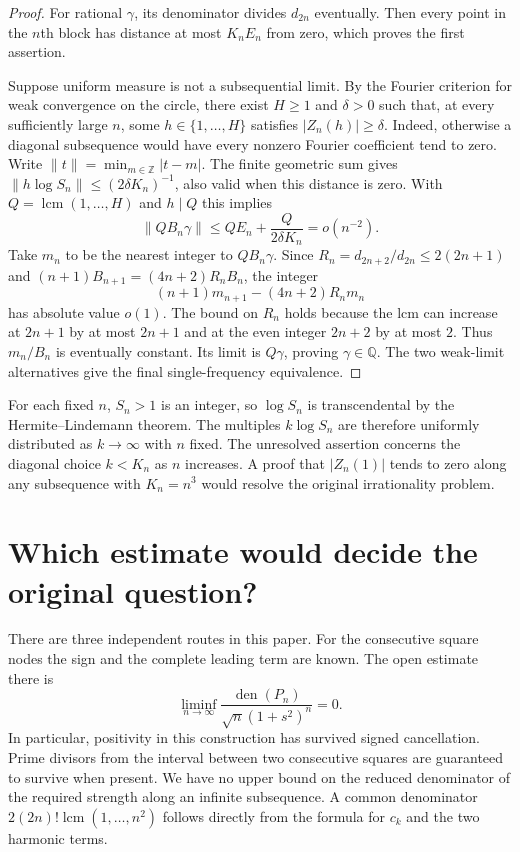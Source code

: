 \documentclass[11pt,a4paper,oneside,openany]{report}
\theoremstyle{remark}\newtheorem{remark}[theorem]{Remark}
\numberwithin{equation}{section}
\begin{document}
\begin{proof}
For rational $\gamma$, its denominator divides $d_{2n}$ eventually.
Then every point in the $n$th block has distance at most $K_n E_n$ from
zero, which proves the first assertion.

Suppose uniform measure is not a subsequential limit. By the Fourier
criterion for weak convergence on the circle, there exist
$H\ge1$ and $\delta>0$ such that, at every sufficiently large $n$,
some $h\in\{1,\ldots,H\}$ satisfies $|Z_n(h)|\ge\delta$.
Indeed, otherwise a diagonal subsequence would have every nonzero
Fourier coefficient tend to zero. Write $\|t\|=\min_{m\in\mathbb Z}|t-m|$.
The finite geometric sum gives $\|h\log S_n\|\le(2\delta K_n)^{-1}$,
also valid when this distance is zero. With $Q=\operatorname{lcm}(1,\ldots,H)$
and $h\mid Q$ this implies
\[
 \|Q B_n\gamma\|
 \le Q E_n+\frac{Q}{2\delta K_n}=o(n^{-2}).
\]
Take $m_n$ to be the nearest integer to $Q B_n\gamma$. Since
$R_n=d_{2n+2}/d_{2n}\le2(2n+1)$ and
$(n+1)B_{n+1}=(4n+2)R_nB_n$, the integer
\[
 (n+1)m_{n+1}-(4n+2)R_nm_n
\]
has absolute value $o(1)$. The bound on $R_n$ holds because the
lcm can increase at $2n+1$ by at most $2n+1$ and at the even
integer $2n+2$ by at most $2$. Thus $m_n/B_n$ is eventually constant.
Its limit is $Q\gamma$, proving $\gamma\in\mathbb Q$. The two
weak-limit alternatives give the final single-frequency equivalence.
\end{proof}

For each fixed $n$, $S_n>1$ is an integer, so $\log S_n$ is
transcendental by the Hermite--Lindemann theorem. The multiples
$k\log S_n$ are therefore uniformly distributed as $k\to\infty$
with $n$ fixed. The unresolved assertion concerns the diagonal
choice $k<K_n$ as $n$ increases. A proof that $|Z_n(1)|$ tends to
zero along any subsequence with $K_n=n^3$ would resolve
the original irrationality problem.

\section{Which estimate would decide the original question?}
There are three independent routes in this paper. For the consecutive square nodes the sign and the complete leading term are known. The open estimate there is
\[
 \liminf_{n\to\infty}\frac{\operatorname{den}(P_n)}
            {\sqrt n(1+s^2)^n}=0 .
\]
In particular, positivity in this construction has survived signed cancellation. Prime divisors from the interval between two consecutive squares are guaranteed to survive when present. We have no upper bound on the reduced denominator of the required strength along an infinite subsequence. A common denominator $2(2n)!\operatorname{lcm}(1,\ldots,n^2)$ follows directly from the formula for $c_k$ and the two harmonic terms.
\end{document}
